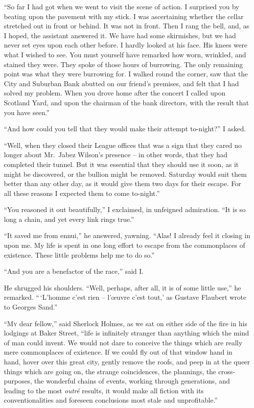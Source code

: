 “So far I had got when we went to visit the scene of
action. I surprised you by beating upon the pavement with
my stick. I was ascertaining whether the cellar stretched out
in front or behind. It was not in front. Then I rang the bell,
and, as I hoped, the assistant answered it. We have had
some skirmishes, but we had never set eyes upon each other
before. I hardly looked at his face. His knees were what I
wished to see. You must yourself have remarked how worn,
wrinkled, and stained they were. They spoke of those hours
of burrowing. The only remaining point was what they were
burrowing for. I walked round the corner, saw that the City
and Suburban Bank abutted on our friend’s premises, and felt
that I had solved my problem. When you drove home after
the concert I called upon Scotland Yard, and upon the
chairman of the bank directors, with the result that you have
seen.”

“And how could you tell that they would make their attempt
to-night?” I asked.

“Well, when they closed their League offices that was a
sign that they cared no longer about Mr.~Jabez Wilson’s
presence -- in other words, that they had completed their tunnel.
But it was essential that they should use it soon, as it might
be discovered, or the bullion might be removed. Saturday
would suit them better than any other day, as it would give
them two days for their escape. For all these reasons I expected
them to come to-night.”

“You reasoned it out beautifully,” I exclaimed, in unfeigned
admiration. “It is so long a chain, and yet every link rings
true.”

“It saved me from ennui,” he answered, yawning. “Alas!
I already feel it closing in upon me. My life is spent in one
long effort to escape from the commonplaces of existence.
These little problems help me to do so.”

“And you are a benefactor of the race,” said I.

He shrugged his shoulders. “Well, perhaps, after all, it is
of some little use,” he remarked. “\,‘L’homme c’est rien --
l’œuvre c’est tout,’ as Gustave Flaubert wrote to Georges
Sand.”


“\textsc{My} dear fellow,” said Sherlock Holmes, as we sat on
either side of the fire in his lodgings at Baker
Street, “life is infinitely stranger than anything
which the mind of man could invent. We would
not dare to conceive the things which are really mere commonplaces
of existence. If we could fly out of that window
hand in hand, hover over this great city, gently remove the
roofs, and peep in at the queer things which are going on, the
strange coincidences, the plannings, the cross-purposes, the
wonderful chains of events, working through generations, and
leading to the most \textit{outré} results, it would make all fiction
with its conventionalities and foreseen conclusions most stale
and unprofitable.”


